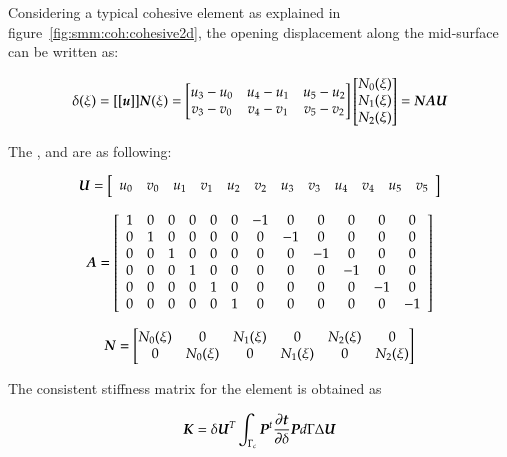 Considering a typical cohesive element as explained in figure~\ref{fig:smm:coh:cohesive2d}, the opening
displacement along the mid-surface can be written as:

\begin{equation}
  \label{eq:opening}
  \delta(\xi) = [[\boldsymbol{u}]] \boldsymbol{N}(\xi) =
\begin{bmatrix}
u_3-u_0 & u_4-u_1 & u_5-u_2\\
v_3-v_0 & v_4-v_1 & v_5-v_2
\end{bmatrix}
\begin{bmatrix}
N_0(\xi) \\ N_1(\xi) \\ N_2(\xi)
\end{bmatrix} =
\boldsymbol{N A U}
\end{equation}

 The  ,  and  are as following:

\begin{equation}
  \boldsymbol{U} = \left [
\begin{array}{c c c c c c c c c c c c}
u_0 & v_0 & u_1 & v_1 & u_2 & v_2 & u_3 & v_3 & u_4 & v_4 & u_5 & v_5
\end{array}\right ]
\end{equation}


\begin{equation}
  \boldsymbol{A} = \left [\begin{array}{c c c c c c c c c c c c}
1 & 0 & 0 & 0& 0 & 0 & -1& 0 & 0 &0 &0 &0\\
0 &1& 0&0 &0 &0 &0 & -1& 0& 0 & 0 &0\\
0 &0& 1&0 &0 &0 &0 & 0& -1& 0 & 0 &0\\
0 &0& 0&1 &0 &0 &0 & 0& 0& -1 & 0 &0\\
0 &0& 0&0 &1 &0 &0 & 0& 0& 0 & -1 &0\\
0 &0& 0&0 &0 &1 &0 & 0& 0& 0 & 0 &-1
\end{array} \right ]
\end{equation}


 \begin{equation}
 \boldsymbol{N} = \begin{bmatrix}
N_0(\xi) & 0 & N_1(\xi) &0 & N_2(\xi) & 0\\
0 & N_0(\xi)& 0 &N_1(\xi)& 0 & N_2(\xi)
\end{bmatrix}
\end{equation}

The consistent stiffness matrix for the element is obtained as

\begin{equation}
  \label{eq:cohesive_stiffness}
  \boldsymbol{K}    =    \delta    \boldsymbol{U}^T    \int_{\Gamma_c}    {\boldsymbol{P}^t
    \frac{\partial{\ensuremath{\boldsymbol{t}}}} {\partial{\delta}} \boldsymbol{P} d
    \Gamma \Delta \boldsymbol{U}}
\end{equation}

